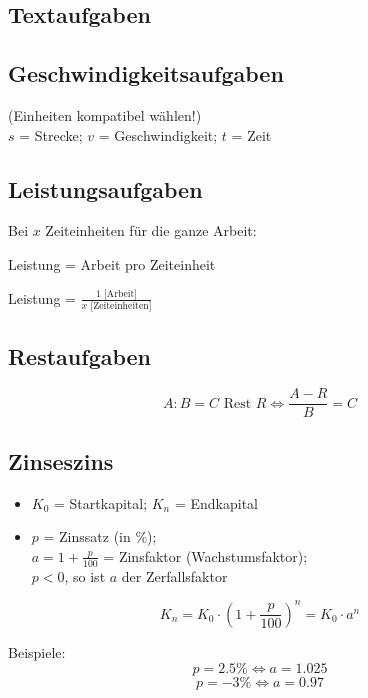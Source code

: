 \begin{multicols}{2}
\forceCB
\keinHeaderUndKeinFooter{}

\section*{Textaufgaben}
\subsection*{Geschwindigkeitsaufgaben}
 (Einheiten kompatibel wählen!)\\
$s$ = Strecke; $v$ = Geschwindigkeit; $t$ = Zeit

\subsection*{Leistungsaufgaben}
Bei $x$ Zeiteinheiten für die ganze Arbeit:

Leistung = Arbeit pro Zeiteinheit

Leistung = $\frac{1 \textrm{ [Arbeit]}}{x \textrm{ [Zeiteinheiten]}}$


\subsection*{Restaufgaben}
$$A:B = C \textrm{ Rest } R \Leftrightarrow{}\frac{A-R}B=C$$


\subsection*{Zinseszins}
\begin{itemize}
\item $K_0$ = Startkapital; $K_n$ = Endkapital
\item $p$ = Zinssatz (in \%);\\ $a = 1+\frac{p}{100}$ = Zinsfaktor
(Wachstumsfaktor);\\ $p<0$, so ist $a$ der Zerfallsfaktor
\end{itemize}
$$K_n = K_0 \cdot{} \left( 1+\frac{p}{100} \right)^n = K_0\cdot{}a^n$$

Beispiele:
$$p = 2.5\% \Longleftrightarrow{} a = 1.025$$
$$p = -3\% \Longleftrightarrow{}  a = 0.97 $$



\end{multicols}
